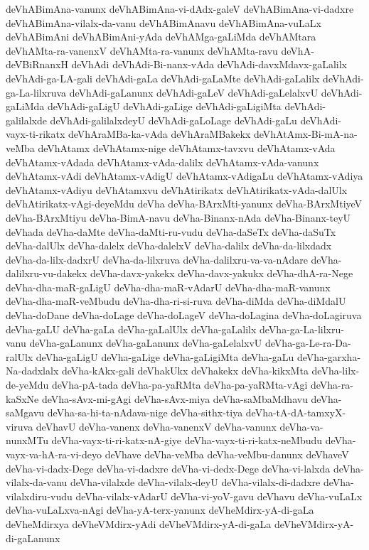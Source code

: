 {deVhABimAna-vanunx
deVhABimAna-vi-dAdx-galeV
deVhABimAna-vi-dadxre
deVhABimAna-vilalx-da-vanu
deVhABimAnavu
deVhABimAna-vuLaLx
deVhABimAni
deVhABimAni-yAda
deVhAMga-gaLiMda
deVhAMtara
deVhAMta-ra-vanenxV
deVhAMta-ra-vanunx
deVhAMta-ravu
deVhA-deVBiRnanxH
deVhAdi
deVhAdi-Bi-nanx-vAda
deVhAdi-davxMdavx-gaLalilx
deVhAdi-ga-LA-gali
deVhAdi-gaLa
deVhAdi-gaLaMte
deVhAdi-gaLalilx
deVhAdi-ga-La-lilxruva
deVhAdi-gaLanunx
deVhAdi-gaLeV
deVhAdi-gaLelalxvU
deVhAdi-gaLiMda
deVhAdi-gaLigU
deVhAdi-gaLige
deVhAdi-gaLigiMta
deVhAdi-galilalxde
deVhAdi-galilalxdeyU
deVhAdi-gaLoLage
deVhAdi-gaLu
deVhAdi-vayx-ti-rikatx
deVhAraMBa-ka-vAda
deVhAraMBakekx
deVhAtAmx-Bi-mA-na-veMba
deVhAtamx
deVhAtamx-nige
deVhAtamx-tavxvu
deVhAtamx-vAda
deVhAtamx-vAdada
deVhAtamx-vAda-dalilx
deVhAtamx-vAda-vanunx
deVhAtamx-vAdi
deVhAtamx-vAdigU
deVhAtamx-vAdigaLu
deVhAtamx-vAdiya
deVhAtamx-vAdiyu
deVhAtamxvu
deVhAtirikatx
deVhAtirikatx-vAda-dalUlx
deVhAtirikatx-vAgi-deyeMdu
deVha
deVha-BArxMti-yanunx
deVha-BArxMtiyeV
deVha-BArxMtiyu
deVha-BimA-navu
deVha-Binanx-nAda
deVha-Binanx-teyU
deVhada
deVha-daMte
deVha-daMti-ru-vudu
deVha-daSeTx
deVha-daSuTx
deVha-dalUlx
deVha-dalelx
deVha-dalelxV
deVha-dalilx
deVha-da-lilxdadx
deVha-da-lilx-dadxrU
deVha-da-lilxruva
deVha-dalilxru-va-va-nAdare
deVha-dalilxru-vu-dakekx
deVha-davx-yakekx
deVha-davx-yakukx
deVha-dhA-ra-Nege
deVha-dha-maR-gaLigU
deVha-dha-maR-vAdarU
deVha-dha-maR-vanunx
deVha-dha-maR-veMbudu
deVha-dha-ri-si-ruva
deVha-diMda
deVha-diMdalU
deVha-doDane
deVha-doLage
deVha-doLageV
deVha-doLagina
deVha-doLagiruva
deVha-gaLU
deVha-gaLa
deVha-gaLalUlx
deVha-gaLalilx
deVha-ga-La-lilxru-vanu
deVha-gaLanunx
deVha-gaLanunx
deVha-gaLelalxvU
deVha-ga-Le-ra-Da-ralUlx
deVha-gaLigU
deVha-gaLige
deVha-gaLigiMta
deVha-gaLu
deVha-garxha-Na-dadxlalx
deVha-kAkx-gali
deVhakUkx
deVhakekx
deVha-kikxMta
deVha-lilx-de-yeMdu
deVha-pA-tada
deVha-pa-yaRMta
deVha-pa-yaRMta-vAgi
deVha-ra-kaSxNe
deVha-sAvx-mi-gAgi
deVha-sAvx-miya
deVha-saMbaMdhavu
deVha-saMgavu
deVha-sa-hi-ta-nAdava-nige
deVha-sithx-tiya
deVha-tA-dA-tamxyX-viruva
deVhavU
deVha-vanenx
deVha-vanenxV
deVha-vanunx
deVha-va-nunxMTu
deVha-vayx-ti-ri-katx-nA-giye
deVha-vayx-ti-ri-katx-neMbudu
deVha-vayx-va-hA-ra-vi-deyo
deVhave
deVha-veMba
deVha-veMbu-danunx
deVhaveV
deVha-vi-dadx-Dege
deVha-vi-dadxre
deVha-vi-dedx-Dege
deVha-vi-lalxda
deVha-vilalx-da-vanu
deVha-vilalxde
deVha-vilalx-deyU
deVha-vilalx-di-dadxre
deVha-vilalxdiru-vudu
deVha-vilalx-vAdarU
deVha-vi-yoV-gavu
deVhavu
deVha-vuLaLx
deVha-vuLaLxva-nAgi
deVha-yA-terx-yanunx
deVheMdirx-yA-di-gaLa
deVheMdirxya
deVheVMdirx-yAdi
deVheVMdirx-yA-di-gaLa
deVheVMdirx-yA-di-gaLanunx
}
